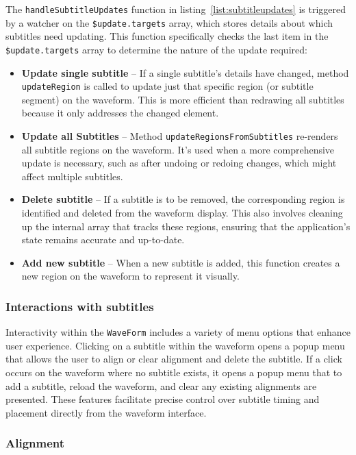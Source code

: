 The \texttt{handleSubtitleUpdates} function in listing~\ref{list:subtitleupdates} is triggered by a watcher on the \texttt{\$update.targets} array, which stores details about which subtitles need updating. This function specifically checks the last item in the \texttt{\$update.targets} array to determine the nature of the update required:
\begin{itemize}
    \item \textbf{Update single subtitle} -- If a single subtitle's details have changed, method \texttt{updateRegion} is called to update just that specific region (or subtitle segment) on the waveform. This is more efficient than redrawing all subtitles because it only addresses the changed element.
    \item \textbf{Update all Subtitles} -- Method \texttt{updateRegionsFromSubtitles} re-renders all subtitle regions on the waveform. It's used when a more comprehensive update is necessary, such as after undoing or redoing changes, which might affect multiple subtitles.
    \item \textbf{Delete subtitle} -- If a subtitle is to be removed, the corresponding region is identified and deleted from the waveform display. This also involves cleaning up the internal array that tracks these regions, ensuring that the application's state remains accurate and up-to-date.
    \item \textbf{Add new subtitle} -- When a new subtitle is added, this function creates a new region on the waveform to represent it visually.
\end{itemize}

\subsubsection{Interactions with subtitles}

Interactivity within the \texttt{WaveForm} includes a variety of menu options that enhance user experience. Clicking on a subtitle within the waveform opens a popup menu that allows the user to align or clear alignment and delete the subtitle. If a click occurs on the waveform where no subtitle exists, it opens a popup menu that to add a subtitle, reload the waveform, and clear any existing alignments are presented. These features facilitate precise control over subtitle timing and placement directly from the waveform interface.

\subsubsection{Alignment}

